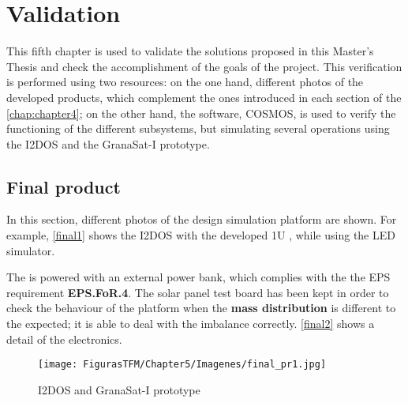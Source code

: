 \chapter{Validation}\label{chap:chapter5}


This fifth chapter is used to validate the solutions proposed in this Master's Thesis and check the accomplishment of the goals of the project. This verification is performed using two resources: on the one hand, different photos of the developed products, which complement the ones introduced in each section of the \autoref{chap:chapter4}; on the other hand, the  software, COSMOS, is used to verify the functioning of the different subsystems, but simulating several operations using the \acrshort{I2DOS} and the GranaSat-I  prototype.


\section{Final product} 
%

In this section, different photos of the design simulation platform are shown. For example, \autoref{final1} shows the \acrshort{I2DOS} with the developed 1U , while using the \acrshort{LED} simulator.

The  is powered with an external power bank, which complies with the the \acrshort{EPS} requirement \textbf{EPS.FoR.4}. The solar panel test board has been kept in order to check the behaviour of the platform when the \textbf{mass distribution} is different to the expected; it is able to deal with the imbalance correctly. \autoref{final2} shows a detail of the  electronics.

	\begin{figure} [H]
			\centering
			\texttt{[image: FigurasTFM/Chapter5/Imagenes/final\_pr1.jpg]}
			\caption{\acrshort{I2DOS} and GranaSat-I prototype} 	\label{final1}
			\vspace{-0.5cm}
\end{figure}


